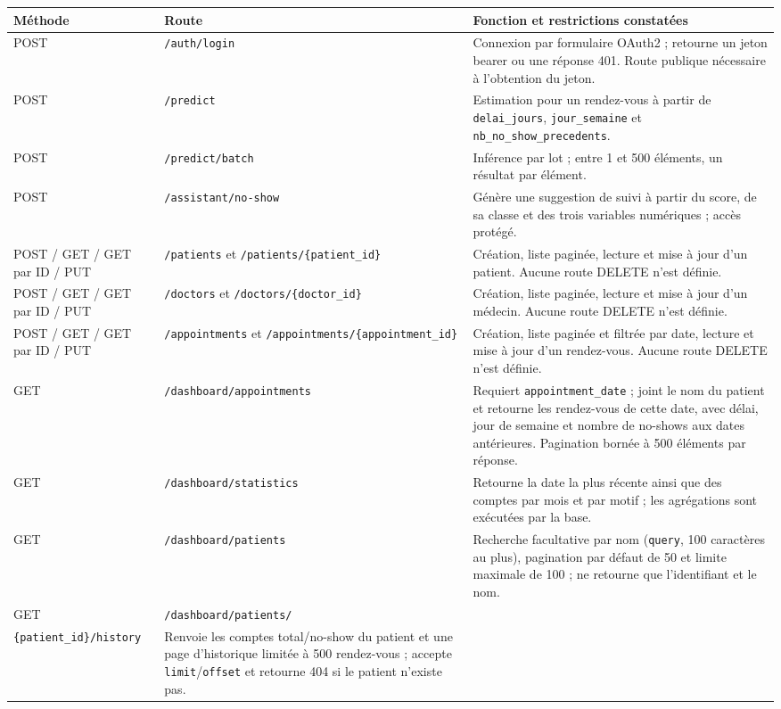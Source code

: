\documentclass[11pt,a4paper]{report}
\newcommand{\code}[1]{\texttt{#1}}
\begin{document}
\begin{longtable}{>{\raggedright\arraybackslash}p{2.35cm}
                  >{\raggedright\arraybackslash}p{4.3cm}
                  >{\raggedright\arraybackslash}p{7.1cm}}
\toprule
Méthode & Route & Fonction et restrictions constatées\\
\midrule
\endhead
POST & \code{/auth/login} & Connexion par formulaire OAuth2 ; retourne un
jeton bearer ou une réponse 401. Route publique nécessaire à l'obtention du
jeton.\\
POST & \code{/predict} & Estimation pour un rendez-vous à partir de
\code{delai\_jours}, \code{jour\_semaine} et
\code{nb\_no\_show\_precedents}.\\
POST & \code{/predict/batch} & Inférence par lot ; entre 1 et 500 éléments,
un résultat par élément.\\
POST & \code{/assistant/no-show} & Génère une suggestion de suivi à partir du
score, de sa classe et des trois variables numériques ; accès protégé.\\
POST / GET / GET par ID / PUT & \code{/patients} et
\code{/patients/\{patient\_id\}} & Création, liste paginée, lecture et mise à
jour d'un patient. Aucune route DELETE n'est définie.\\
POST / GET / GET par ID / PUT & \code{/doctors} et
\code{/doctors/\{doctor\_id\}} & Création, liste paginée, lecture et mise à
jour d'un médecin. Aucune route DELETE n'est définie.\\
POST / GET / GET par ID / PUT & \code{/appointments} et
\code{/appointments/\{appointment\_id\}} & Création, liste paginée et filtrée
par date, lecture et mise à jour d'un rendez-vous. Aucune route DELETE n'est
définie.\\
GET & \code{/dashboard/appointments} & Requiert \code{appointment\_date} ;
joint le nom du patient et retourne les rendez-vous de cette date, avec délai,
jour de semaine et nombre de no-shows aux dates antérieures. Pagination bornée
à 500 éléments par réponse.\\
GET & \code{/dashboard/statistics} & Retourne la date la plus récente ainsi
que des comptes par mois et par motif ; les agrégations sont exécutées par la
base.\\
GET & \code{/dashboard/patients} & Recherche facultative par nom
(\code{query}, 100 caractères au plus), pagination par défaut de 50 et limite
maximale de 100 ; ne retourne que l'identifiant et le nom.\\
GET & \code{/dashboard/patients/}\\\code{\{patient\_id\}/history} & Renvoie les
comptes total/no-show du patient et une page d'historique limitée à 500
rendez-vous ; accepte \code{limit}/\code{offset} et retourne 404 si le patient
n'existe pas.\\
\bottomrule
\end{longtable}
\end{document}
